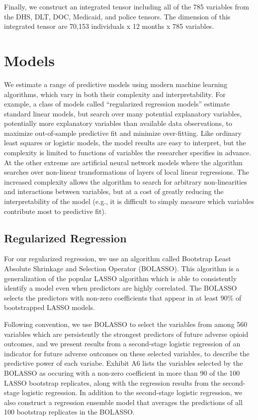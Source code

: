 \documentclass[10pt, letter]{article}
\begin{document}
Finally, we construct an integrated tensor including all of the 785 variables from the DHS, DLT, DOC, Medicaid, and police tensors. The dimension of this integrated tensor are 70,153 individuals x 12 months x 785 variables.

\section{Models}

We estimate a range of predictive models using modern machine learning algorithms, which vary in both their complexity and interpretability. For example, a class of models called ``regularized regression models'' estimate standard linear models, but search over many potential explanatory variables, potentially more explanatory variables than available data observations, to maximize out-of-sample predictive fit and minimize over-fitting. Like ordinary least squares or logistic models, the model results are easy to interpret, but the complexity is limited to functions of variables the researcher specifies in advance. At the other extreme are artificial neural network models where the algorithm searches over non-linear transformations of layers of local linear regressions. The increased complexity allows the algorithm to search for arbitrary non-linearities and interactions between variables, but at a cost of greatly reducing the interpretability of the model (e.g., it is difficult to simply measure which variables contribute most to predictive fit).

\subsection{Regularized Regression}

For our regularized regression, we use an algorithm called Bootstrap Least Absolute Shrinkage and Selection Operator (BOLASSO). This algorithm is a generalization of the popular LASSO algorithm which is able to consistently identify a model even when predictors are highly correlated. The BOLASSO selects the predictors with non-zero coefficients that appear in at least 90\% of bootstrapped LASSO models. 

Following convention, we use BOLASSO to select the variables from among 560 variables which are persistently the strongest predictors of future adverse opioid outcomes, and we present results from a second-stage logistic regression of an indicator for future adverse outcomes on these selected variables, to describe the predictive power of each variabe. Exhibit A6 lists the variables selected by the BOLASSO as occuring with a non-zero coefficient in more than 90 of the 100 LASSO bootstrap replicates, along with the regression results from the second-stage logistic regression. In addition to the second-stage logistic regression, we also construct a regression ensemble model that averages the predictions of all 100 bootstrap replicates in the BOLASSO.
\end{document}
